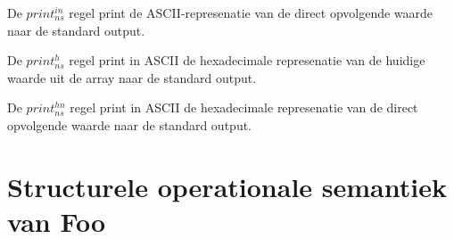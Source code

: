 \documentclass[11pt]{article}
\begin{document}
De $print^{in}_{ns}$ regel print de ASCII-represenatie van de direct opvolgende waarde naar de standard output.
\begin{prooftree}
\end{prooftree}

De $print^h_{ns}$ regel print in ASCII de hexadecimale represenatie van de huidige waarde uit de array naar de standard output.
\begin{prooftree}
\end{prooftree}

De $print^{hn}_{ns}$ regel print in ASCII de hexadecimale represenatie van de direct opvolgende waarde naar de standard output.
\begin{prooftree}
\end{prooftree}



\section{Structurele operationale semantiek van Foo}

%
\end{document}
